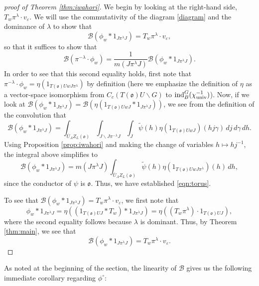\documentclass[11pt,letterpaper]{article}
\newcommand{\calB}{\mathcal{B}}
\newcommand{\ve}{\varepsilon}
\newcommand{\bs}{\backslash}
\newcommand{\goth}{\mathfrak}
\newcommand{\ind}{\textup{ind}}
\theoremstyle{remark}
\numberwithin{equation}{section}
\begin{document}
\begin{proof}[proof of Theorem \ref{thm:iwahori}]
We begin by looking at the right-hand side, $T_w\pi^{\lambda} \cdot v_{\ve}$. We will use the commutativity of the diagram \eqref{diagram} and the dominance of $\lambda$ to show that $$\calB(\phi_w \ast 1_{J\pi^{\lambda}J}) = T_w\pi^{\lambda} \cdot v_{\ve},$$ so that it suffices to show that \begin{equation}\label{eqn:torus} \calB(\pi^{-\lambda}\cdot \phi_w) = \frac{1}{m(J\pi^{\lambda}J)}\calB(\phi_w \ast 1_{J\pi^{\lambda}J}).\end{equation} In order to see that this second equality holds, first note that $\pi^{-\lambda}\cdot \phi_w = \eta(1_{T(\goth{o})UwJ\pi^{\lambda}})$ by definition (here we emphasize the definition of $\eta$ as a vector-space isomorphism from $C_c(T(\goth{o})U \bs G)$ to $\ind_B^G(\chi_{\textup{univ}}^{-1})$). Now, if we look at $\calB(\phi_w \ast 1_{J\pi^{\lambda}J}) = \calB(\eta(1_{T(\goth{o})UwJ} \ast 1_{J\pi^{\lambda}J}))$, we see from the definition of the convolution that $$\calB(\phi_w \ast 1_{J\pi^{\lambda}J}) = \int_{\overline{U}_AZ_L(\goth{o})} \int_{J \bs J\pi^{-\lambda}J} \int_J \widetilde{\psi}(h)\eta(1_{T(\goth{o})UwJ})(hj\gamma)\,dj\,d\gamma\,dh.$$ Using Proposition \ref{prop:iwahori} and making the change of variables $h \mapsto hj^{-1}$, the integral above simplifies to $$\calB(\phi_w \ast 1_{J\pi^{\lambda}J}) = m(J\pi^{\lambda}J) \int_{\overline{U}_AZ_L(\goth{o})} \widetilde{\psi}(h)\eta(1_{T(\goth{o})UwJ\pi^{\lambda}})(h)\,dh,$$ since the conductor of $\psi$ is $\goth{o}$. Thus, we have established \eqref{eqn:torus}.


To see that $\calB(\phi_w \ast 1_{J\pi^{\lambda}J}) = T_w\pi^{\lambda}\cdot v_{\ve}$, we first note that $$\phi_w \ast 1_{J\pi^{\lambda}J} = \eta((1_{T(\goth{o})UJ} \ast T_w)\ast 1_{J\pi^{\lambda}J}) = \eta((T_w\pi^{\lambda})\cdot 1_{T(\goth{o})UJ}),$$ where the second equality follows because $\lambda$ is dominant. Thus, by Theorem \ref{thm:main}, we see that $$\calB(\phi_w \ast 1_{J\pi^{\lambda}J}) = T_w\pi^{\lambda} \cdot v_{\ve}.$$

\end{proof}

As noted at the beginning of the section, the linearity of $\calB$ gives us the following immediate corollary regarding $\phi^{\circ}$:
\end{document}
